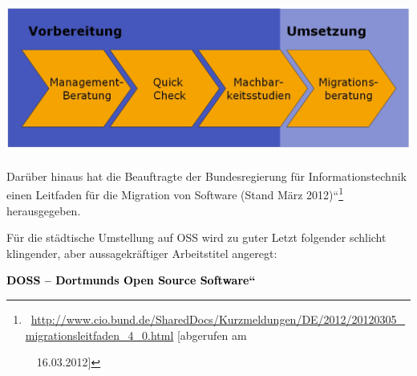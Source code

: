 \documentclass[a4paper]{article}
\begin{document}
\bigskip

{\centering 
\includegraphics[width=6.5484in,height=1.9701in]{freiesoftwaredortmund-img2.png}
\par}


\bigskip

{
Dar\"uber hinaus hat die Beauftragte der Bundesregierung f\"ur
Informationstechnik einen {\quotedblbase}Leitfaden f\"ur die Migration
von Software (Stand M\"arz
2012){\textquotedblleft}\footnote{\ \url{http://www.cio.bund.de/SharedDocs/Kurzmeldungen/DE/2012/20120305_migrationsleitfaden_4_0.html}
[abgerufen am\par \ \ 16.03.2012]} herausgegeben.}



\bigskip


\bigskip

{
F\"ur die st\"adtische Umstellung auf OSS wird zu guter Letzt folgender
schlicht klingender, aber aussagekr\"aftiger Arbeitstitel angeregt:}


\bigskip


\bigskip

{\centering{}
\foreignlanguage{english}{\textbf{\textcolor{black}{{\quotedblbase}}}}\foreignlanguage{english}{\textbf{\textcolor{black}{DOSS}}}\foreignlanguage{english}{\textbf{\textcolor{black}{
--
}}}\foreignlanguage{english}{\textbf{\textcolor{black}{Dortmunds}}}\foreignlanguage{english}{\textbf{\textcolor{black}{
}}}\foreignlanguage{english}{\textbf{\textcolor{black}{Open}}}\foreignlanguage{english}{\textbf{\textcolor{black}{
}}}\foreignlanguage{english}{\textbf{\textcolor{black}{Source}}}\foreignlanguage{english}{\textbf{\textcolor{black}{
}}}\foreignlanguage{english}{\textbf{\textcolor{black}{Software}}}\foreignlanguage{english}{\textbf{\textcolor{black}{{\textquotedblleft}}}}
\par}
\end{document}
